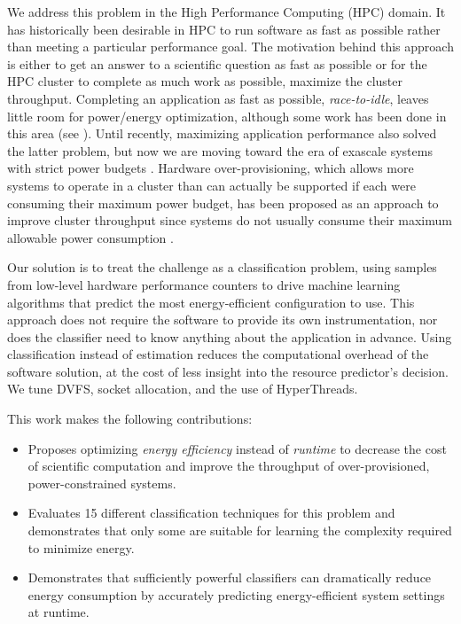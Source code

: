 We address this problem in the High Performance Computing (HPC) domain.
It has historically been desirable in HPC to run software as fast as possible rather than meeting a particular performance goal.
The motivation behind this approach is either to get an answer to a scientific question as fast as possible or for the HPC cluster to complete as much work as possible, \ie maximize the cluster throughput.
Completing an application as fast as possible, \ie \emph{race-to-idle}, leaves little room for power/energy optimization, although some work has been done in this area (see ).
Until recently, maximizing application performance also solved the latter problem, but now we are moving toward the era of exascale systems with strict power budgets \cite{Exascale20MW}.
Hardware over-provisioning, which allows more systems to operate in a cluster than can actually be supported if each were consuming their maximum power budget, has been proposed as an approach to improve cluster throughput since systems do not usually consume their maximum allowable power consumption \cite{PatkiRMAP}.

Our solution is to treat the challenge as a classification problem, using samples from low-level hardware performance counters to drive machine learning algorithms that predict the most energy-efficient configuration to use.
This approach does not require the software to provide its own instrumentation, nor does the classifier need to know anything about the application in advance.
Using classification instead of estimation reduces the computational overhead of the software solution, at the cost of less insight into the resource predictor's decision.
We tune DVFS, socket allocation, and the use of HyperThreads.

This work makes the following contributions:
\begin{itemize}
\item Proposes optimizing \emph{energy efficiency} instead of \emph{runtime} to decrease the cost of scientific computation and improve the throughput of over-provisioned, power-constrained systems.
\item Evaluates 15 different classification techniques for this problem and demonstrates that only some are suitable for learning the complexity required to minimize energy.
\item Demonstrates that sufficiently powerful classifiers can dramatically reduce energy consumption by accurately predicting energy-efficient system settings at runtime.
\end{itemize}
